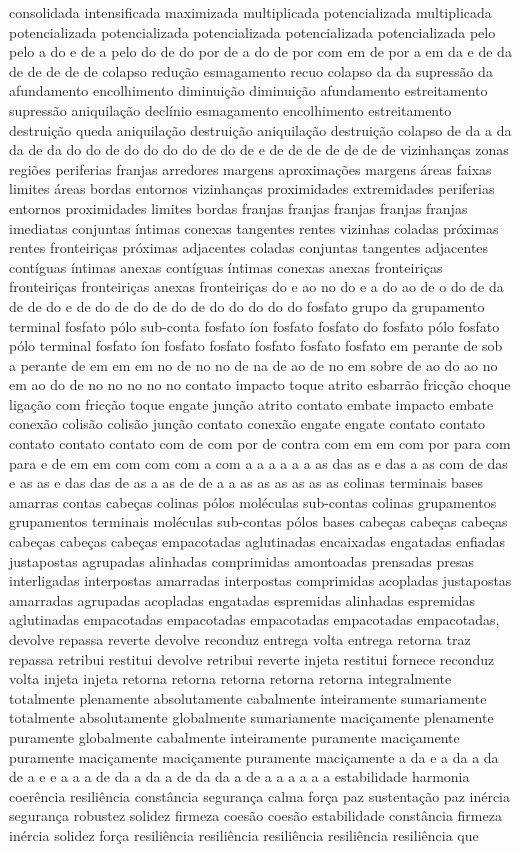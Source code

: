 consolidada intensificada maximizada multiplicada potencializada multiplicada potencializada potencializada potencializada potencializada potencializada pelo pelo a do e de a pelo do de do por de a do de por com em de por a em da e de da de de de de de colapso redução esmagamento recuo colapso da da supressão da afundamento encolhimento diminuição diminuição afundamento estreitamento supressão aniquilação declínio esmagamento encolhimento estreitamento destruição queda aniquilação destruição aniquilação destruição colapso de da a da da de da do do de do do do do de do de e de de de de de de de vizinhanças zonas regiões periferias franjas arredores margens aproximações margens áreas faixas limites áreas bordas entornos vizinhanças proximidades extremidades periferias entornos proximidades limites bordas franjas franjas franjas franjas franjas imediatas conjuntas íntimas conexas tangentes rentes vizinhas coladas próximas rentes fronteiriças próximas adjacentes coladas conjuntas tangentes adjacentes contíguas íntimas anexas contíguas íntimas conexas anexas fronteiriças fronteiriças fronteiriças anexas fronteiriças do e ao no do e a do ao de o do de da de de do e de do de do de do de do do do do do fosfato grupo da grupamento terminal fosfato pólo sub-conta fosfato íon fosfato fosfato do fosfato pólo fosfato pólo terminal fosfato íon fosfato fosfato fosfato fosfato fosfato em perante de sob a perante de em em em no de no no de na de ao de no em sobre de ao do ao no em ao do de no no no no no contato impacto toque atrito esbarrão fricção choque ligação com fricção toque engate junção atrito contato embate impacto embate conexão colisão colisão junção contato conexão engate engate contato contato contato contato contato com de com por de contra com em em com por para com para e de em em com com com a com a a a a a a as das as e das a as com de das e as as e das das de as a as de de a a as as as as as as colinas terminais bases amarras contas cabeças colinas pólos moléculas sub-contas colinas grupamentos grupamentos terminais moléculas sub-contas pólos bases cabeças cabeças cabeças cabeças cabeças cabeças empacotadas aglutinadas encaixadas engatadas enfiadas justapostas agrupadas alinhadas comprimidas amontoadas prensadas presas interligadas interpostas amarradas interpostas comprimidas acopladas justapostas amarradas agrupadas acopladas engatadas espremidas alinhadas espremidas aglutinadas empacotadas empacotadas empacotadas empacotadas empacotadas, devolve repassa reverte devolve reconduz entrega volta entrega retorna traz repassa retribui restitui devolve retribui reverte injeta restitui fornece reconduz volta injeta injeta retorna retorna retorna retorna retorna integralmente totalmente plenamente absolutamente cabalmente inteiramente sumariamente totalmente absolutamente globalmente sumariamente maciçamente plenamente puramente globalmente cabalmente inteiramente puramente maciçamente puramente maciçamente maciçamente puramente maciçamente a da e a da a da de a e e a a a de da a da a de da da a de a a a a a a estabilidade harmonia coerência resiliência constância segurança calma força paz sustentação paz inércia segurança robustez solidez firmeza coesão coesão estabilidade constância firmeza inércia solidez força resiliência resiliência resiliência resiliência resiliência que 